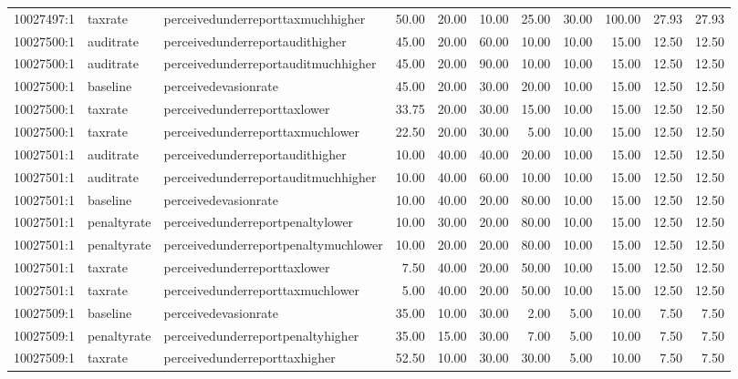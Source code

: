 \begin{table}[ht]
\begin{tabular}{lllrrrrrrrr}
  10027497:1 & taxrate & perceivedunderreporttaxmuchhigher & 50.00 & 20.00 & 10.00 & 25.00 & 30.00 & 100.00 & 27.93 & 27.93 \\ 
  10027500:1 & auditrate & perceivedunderreportaudithigher & 45.00 & 20.00 & 60.00 & 10.00 & 10.00 & 15.00 & 12.50 & 12.50 \\ 
  10027500:1 & auditrate & perceivedunderreportauditmuchhigher & 45.00 & 20.00 & 90.00 & 10.00 & 10.00 & 15.00 & 12.50 & 12.50 \\ 
  10027500:1 & baseline & perceivedevasionrate & 45.00 & 20.00 & 30.00 & 20.00 & 10.00 & 15.00 & 12.50 & 12.50 \\ 
  10027500:1 & taxrate & perceivedunderreporttaxlower & 33.75 & 20.00 & 30.00 & 15.00 & 10.00 & 15.00 & 12.50 & 12.50 \\ 
  10027500:1 & taxrate & perceivedunderreporttaxmuchlower & 22.50 & 20.00 & 30.00 & 5.00 & 10.00 & 15.00 & 12.50 & 12.50 \\ 
  10027501:1 & auditrate & perceivedunderreportaudithigher & 10.00 & 40.00 & 40.00 & 20.00 & 10.00 & 15.00 & 12.50 & 12.50 \\ 
  10027501:1 & auditrate & perceivedunderreportauditmuchhigher & 10.00 & 40.00 & 60.00 & 10.00 & 10.00 & 15.00 & 12.50 & 12.50 \\ 
  10027501:1 & baseline & perceivedevasionrate & 10.00 & 40.00 & 20.00 & 80.00 & 10.00 & 15.00 & 12.50 & 12.50 \\ 
  10027501:1 & penaltyrate & perceivedunderreportpenaltylower & 10.00 & 30.00 & 20.00 & 80.00 & 10.00 & 15.00 & 12.50 & 12.50 \\ 
  10027501:1 & penaltyrate & perceivedunderreportpenaltymuchlower & 10.00 & 20.00 & 20.00 & 80.00 & 10.00 & 15.00 & 12.50 & 12.50 \\ 
  10027501:1 & taxrate & perceivedunderreporttaxlower & 7.50 & 40.00 & 20.00 & 50.00 & 10.00 & 15.00 & 12.50 & 12.50 \\ 
  10027501:1 & taxrate & perceivedunderreporttaxmuchlower & 5.00 & 40.00 & 20.00 & 50.00 & 10.00 & 15.00 & 12.50 & 12.50 \\ 
  10027509:1 & baseline & perceivedevasionrate & 35.00 & 10.00 & 30.00 & 2.00 & 5.00 & 10.00 & 7.50 & 7.50 \\ 
  10027509:1 & penaltyrate & perceivedunderreportpenaltyhigher & 35.00 & 15.00 & 30.00 & 7.00 & 5.00 & 10.00 & 7.50 & 7.50 \\ 
  10027509:1 & taxrate & perceivedunderreporttaxhigher & 52.50 & 10.00 & 30.00 & 30.00 & 5.00 & 10.00 & 7.50 & 7.50 \\ 

\end{tabular}
\end{table}
